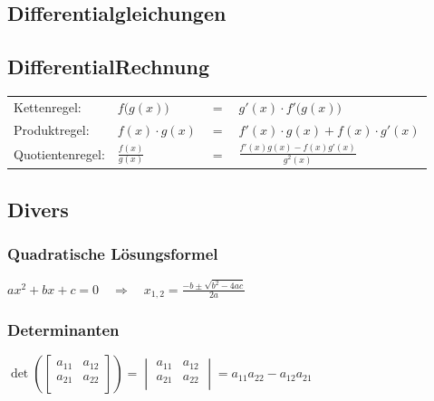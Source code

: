 	
			
	\subsection{Differentialgleichungen}
		
	\subsection{DifferentialRechnung}
		\begin{tabular}{llll}
			Kettenregel:	& $f\big(g(x)\big)$ &$=$ & $g'(x)\cdot f'\big(g(x)\big)$\\[0.1cm]
			Produktregel:	& $f(x)\cdot g(x)$ &$=$ & $f'(x)\cdot g(x) + f(x)\cdot g'(x)$\\[0.1cm]
			Quotientenregel:& $\frac{f(x)}{g(x)}$ &$=$ & $\frac{f'(x)g(x)-f(x)g'(x)}{g^2(x)}$\\
		\end{tabular}
	\subsection{Divers}	
	\begin{minipage}[t]{9.5cm}
		\subsubsection{Quadratische Lösungsformel}
			$ax^2+bx+c=0\quad\Rightarrow\quad x_{1,2}=\frac{-b\pm\sqrt{b^2-4ac}}{2a}$
	\end{minipage}
	\hfill
	\begin{minipage}[t]{9.5cm}
		\subsubsection{Determinanten}
			$\det\left(
			\begin{bmatrix}
				a_{11}&a_{12}\\
				a_{21}&a_{22}\\
			\end{bmatrix}\right)=
			\begin{vmatrix}
				a_{11}&a_{12}\\
				a_{21}&a_{22}\\
			\end{vmatrix}=a_{11}a_{22}-a_{12}a_{21}$
	\end{minipage}\\
	

